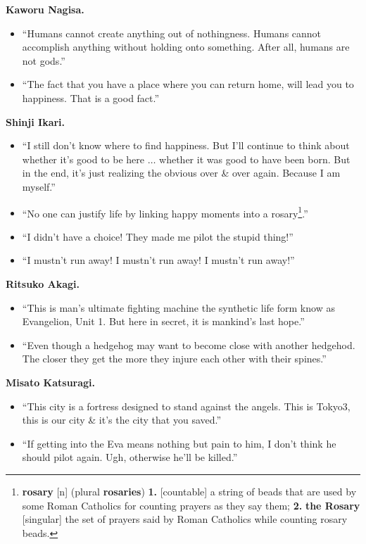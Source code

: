 \documentclass{article}
\begin{document}
\begin{enumerate}
    \textbf{Kaworu Nagisa.}
	\begin{itemize}
   		\item ``Humans cannot create anything out of nothingness. Humans cannot accomplish anything without holding onto something. After all, humans are not gods.''
   		\item ``The fact that you have a place where you can return home, will lead you to happiness. That is a good fact.''
   	\end{itemize}
    \textbf{Shinji Ikari.}
    \begin{itemize}
    	\item ``I still don't know where to find happiness. But I'll continue to think about whether it's good to be here $\ldots$ whether it was good to have been born. But in the end, it's just realizing the obvious over \& over again. Because I am myself.''
    	\item ``No one can justify life by linking happy moments into a rosary\footnote{\textbf{rosary} [n] (plural \textbf{rosaries}) \textbf{1.} [countable] a string of beads that are used by some Roman Catholics for counting prayers as they say them; \textbf{2.} \textbf{the Rosary} [singular] the set of prayers said by Roman Catholics while counting rosary beads.}.''
    	\item ``I didn't have a choice! They made me pilot the stupid thing!''
    	\item ``I mustn't run away! I mustn't run away! I mustn't run away!''
    \end{itemize}
	\textbf{Ritsuko Akagi.}
	\begin{itemize}
		\item ``This is man's ultimate fighting machine the synthetic life form know as Evangelion, Unit 1. But here in secret, it is mankind's last hope.''
		\item ``Even though a hedgehog may want to become close with another hedgehod. The closer they get the more they injure each other with their spines.''
	\end{itemize}
	\textbf{Misato Katsuragi.}
	\begin{itemize}
		\item ``This city is a fortress designed to stand against the angels. This is Tokyo3, this is our city \& it's the city that you saved.''
		\item ``If getting into the Eva means nothing but pain to him, I don't think he should pilot again. Ugh, otherwise he'll be killed.''
	\end{itemize}

\end{enumerate}
\end{document}
